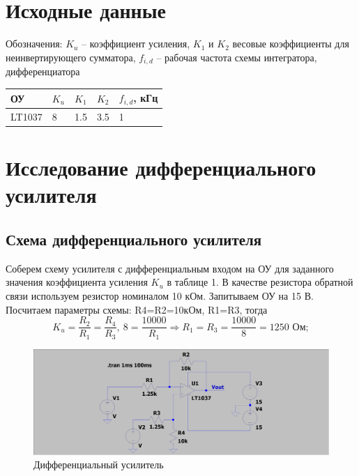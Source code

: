 \documentclass[a4paper, 12pt]{article}
\begin{document}
    \section{Исходные данные}
    Обозначения: $K_u$ -- коэффициент усиления, $K_1$ и $K_2$ весовые коэффициенты для неинвертирующего сумматора,
    $f_{i,d}$ -- рабочая частота схемы интегратора, дифференциатора
    \begin{center}
        \begin{tabular}{ | m{4em} | m{4em}| m{4em} | m{4em} | m{4em} | } 
        \hline
        ОУ& $K_u$ &$K_1$ &$K_2$ &$f_{i,d}$, кГц\\ 
        \hline
        LT1037& 8 & 1.5 &3.5 &1\\ 
        \hline
        \end{tabular}
    \end{center}


    \section{Исследование дифференциального усилителя}
    \subsection{Схема дифференциального усилителя}
    Соберем схему усилителя с дифференциальным входом на ОУ
    для заданного значения коэффициента усиления $K_u$ в таблице 1.
    В качестве резистора обратной связи используем резистор номиналом 10 кОм.
    Запитываем ОУ на 15 В. Посчитаем параметры схемы: R4=R2=10кОм, R1=R3, тогда
    $$
    K_u=\dfrac{R_2}{R_1}=\dfrac{R_4}{R_3},\ 8=\dfrac{10000}{R_1}\Rightarrow R_1=R_3=\dfrac{10000}{8}=1250\text{ Ом};
    $$
    \begin{figure}[H]
        \centering
        \includegraphics[scale=0.22]{scheme1.png}
        \captionsetup{skip=0pt}
        \caption{Дифференциальный усилитель}
        \label{fig:scheme1}
    \end{figure}
\end{document}
